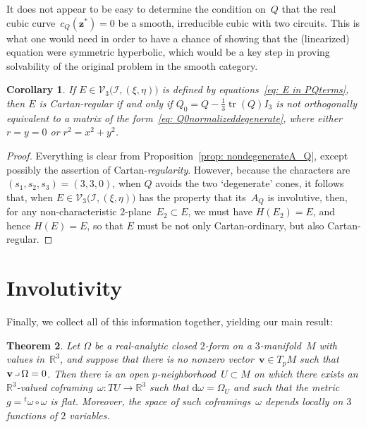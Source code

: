\documentclass[pdftex]{sigma}
\numberwithin{equation}{section}
\newtheorem{Theorem}{Theorem}[section]
\newtheorem{Corollary}[Theorem]{Corollary}
\renewcommand{\d}{\mathrm{d}}%
\newcommand{\cI}{{\mathcal I}}
\newcommand{\cV}{{\mathcal V}}
\newcommand{\bbR}{{\mathbb R}}
\newcommand{\mbv}{\mathbf{v}}
\newcommand{\mbz}{\mathbf{z}}
\DeclareMathOperator{\tr}{tr}
\newcommand{\lhk}{\mathbin{\hbox{\vrule height1.4pt width4pt depth-1pt
 \vrule height4pt width0.4pt depth-1pt}}}
\begin{document}
\begin{Remark}\label{rem: Q-hyperbolicity}
It does not appear to be easy to determine the condition on~$Q$
that the real cubic curve~$c_Q(\mbz^*) = 0$ be a smooth,
irreducible cubic with two circuits. This is what one would need
in order to have a chance of showing that the (linearized) equation
were symmetric hyperbolic, which would be a key step in proving
solvability of the original problem in the smooth category.
\end{Remark}

\begin{Corollary}\label{cor: ECartan-ordinary}
If $E\in \cV_3\bigl(\cI,(\xi,\eta)\bigr)$
is defined by equations~\eqref{eq: E in PQterms},
then $E$ is Cartan-regular
if and only if $Q_0 = Q - \tfrac13\tr(Q)I_3$
is not orthogonally equivalent
to a matrix of the form~\eqref{eq: Q0normalizeddegenerate},
where either $r = y =0$ or $r^2 = x^2+y^2$.
\end{Corollary}

\begin{proof}
Everything is clear from Proposition~\ref{prop: nondegenerateA_Q},
except possibly the assertion of Cartan-\emph{regularity}.
However, because the characters are~$(s_1,s_2,s_3)=(3,3,0)$,
when $Q$ avoids the two `degenerate' cones, it follows that,
when $E\in\cV_3\bigl(\cI,(\xi,\eta)\bigr)$ has the property
that its~$A_Q$ is involutive, then, for any non-characteristic
$2$-plane~$E_2\subset E$, we must have $H(E_2) = E$, and hence
$H(E)=E$, so that $E$ must be not only Cartan-ordinary, but
also Cartan-regular.
\end{proof}

\section{Involutivity}\label{sec: Involutivity}
Finally, we collect all of this information together,
yielding our main result:

\begin{Theorem}\label{nondegenerate-involutive-theorem}
Let $\Omega$ be a real-analytic closed $2$-form on a $3$-manifold~$M$ with values in~$\bbR^3$, and suppose that there is no nonzero vector~$\mbv\in T_pM$
such that $\mbv\lhk\Omega = 0$. Then there is an open $p$-neighborhood~$U\subset M$ on which there exists an $\bbR^3$-valued coframing~$\omega\colon TU\to\bbR^3$
such that $\d\omega = \Omega_U$ and such that the metric~$g = {}^t\omega\circ \omega$ is flat. Moreover, the space of such coframings~$\omega$ depends locally on $3$ functions of $2$ variables.
\end{Theorem}
\end{document}
